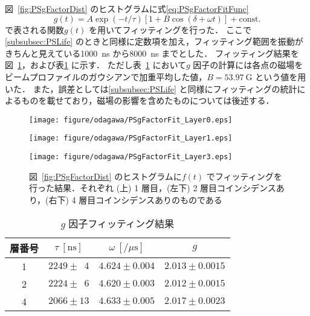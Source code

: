図~\ref{fig:PSgFactorDist} のヒストグラムに式\eqref{eq:PSgFactorFitFunc}
\begin{equation}
g(t) = A \exp(-t / \tau) [1 + B \cos(\delta + \omega t)] + \mathrm{const.}
\label{eq:PSgFactorFitFunc}
\end{equation}
で表される関数$g(t)$ を用いてフィッティングを行った．
ここで\ref{subsubsec:PSLife} のときと同様に定数項を加え，フィッティング範囲を振動がきちんと見えている1000~ns から8000~ns までとした．
フィッティング結果を図~\ref{fig:PSgFactorFit}，および表\ref{tab:PSgFactor} に示す．
ただし表~\ref{tab:PSgFactor} において$g$ 因子の計算には各点の磁場をビームプロファイルのガウシアンで加重平均した値，$B = 53.97~\mathrm{G}$ という値を用いた．
また，誤差としては\ref{subsubsec:PSLife} と同様にフィッティングの統計によるものを載せており，磁場の影響を含めたものについては後述する．
\begin{figure}[h]
	\centering
	\texttt{[image: figure/odagawa/PSgFactorFit\_Layer0.eps]}\\
	\begin{minipage}{0.45\textwidth}
	\centering
	\texttt{[image: figure/odagawa/PSgFactorFit\_Layer1.eps]}
	\end{minipage}
	\begin{minipage}{0.45\textwidth}
	\centering
	\texttt{[image: figure/odagawa/PSgFactorFit\_Layer3.eps]}
	\end{minipage}
	\caption{図~\ref{fig:PSgFactorDist} のヒストグラムに$f(t)$ でフィッティングを行った結果．それぞれ (上) 1 層目，(左下) 2 層目コインシデンスあり，(右下) 4 層目コインシデンスありのものである}
	\label{fig:PSgFactorFit}
\end{figure}%
\begin{table}[h]
	\centering
	\caption{$g$ 因子フィッティング結果}
	\begin{tabular}{cccc} \toprule
	層番号 & $\tau~[\mathrm{ns}]$ & $\omega~[/ \mu\mathrm{s}]$ & $g$ \\ \midrule
	1 & $2249 \pm \phantom{0}4$ & $4.624 \pm 0.004$ & $2.013 \pm 0.0015$ \\  
	2 & $2224 \pm \phantom{0}6$ & $4.620 \pm 0.003$ & $2.012 \pm 0.0015$ \\  
	4 & $2066 \pm 13$ & $4.633 \pm 0.005$ & $2.017 \pm 0.0023$ \\  \bottomrule
	\end{tabular}\label{tab:PSgFactor}
\end{table}%

\newpage

